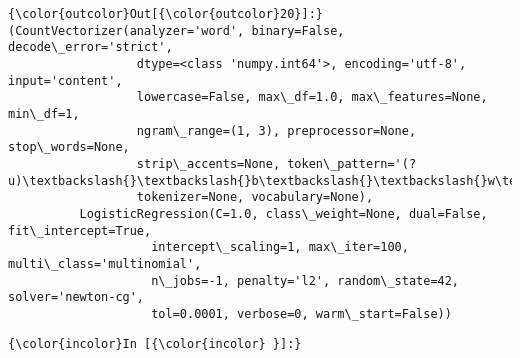 \documentclass[11pt]{article}
\begin{document}
\begin{Verbatim}[commandchars=\\\{\}]
{\color{outcolor}Out[{\color{outcolor}20}]:} (CountVectorizer(analyzer='word', binary=False, decode\_error='strict',
                  dtype=<class 'numpy.int64'>, encoding='utf-8', input='content',
                  lowercase=False, max\_df=1.0, max\_features=None, min\_df=1,
                  ngram\_range=(1, 3), preprocessor=None, stop\_words=None,
                  strip\_accents=None, token\_pattern='(?u)\textbackslash{}\textbackslash{}b\textbackslash{}\textbackslash{}w\textbackslash{}\textbackslash{}w+\textbackslash{}\textbackslash{}b',
                  tokenizer=None, vocabulary=None),
          LogisticRegression(C=1.0, class\_weight=None, dual=False, fit\_intercept=True,
                    intercept\_scaling=1, max\_iter=100, multi\_class='multinomial',
                    n\_jobs=-1, penalty='l2', random\_state=42, solver='newton-cg',
                    tol=0.0001, verbose=0, warm\_start=False))
\end{Verbatim}
            
    \begin{Verbatim}[commandchars=\\\{\}]
{\color{incolor}In [{\color{incolor} }]:} 
\end{Verbatim}


    
    
    
    
\end{document}
